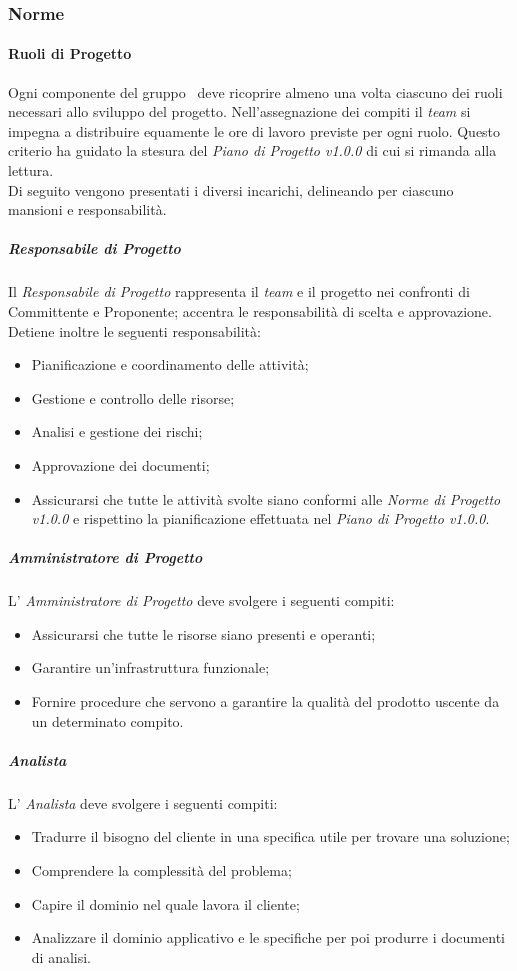 \subsubsection{Norme}
\paragraph{Ruoli di Progetto}
Ogni componente del gruppo \GRUPPO\ deve ricoprire almeno una volta ciascuno dei ruoli necessari allo sviluppo del progetto. Nell'assegnazione dei compiti il \textit{team} si impegna a distribuire equamente le ore di lavoro previste per ogni ruolo. Questo criterio ha guidato la stesura del \textit{Piano di Progetto v1.0.0} di cui si rimanda alla lettura.\\
Di seguito vengono presentati i diversi incarichi, delineando per ciascuno mansioni e responsabilità.

\subparagraph{Responsabile di Progetto} Il \textit{Responsabile di Progetto} rappresenta il \textit{team} e il progetto nei confronti di Committente e Proponente; accentra le responsabilità di scelta e approvazione. Detiene inoltre le seguenti responsabilità:
\begin{itemize}
\item Pianificazione e coordinamento delle attività;
\item Gestione e controllo delle risorse;
\item Analisi e gestione dei rischi;
\item Approvazione dei documenti;
\item Assicurarsi che tutte le attività svolte siano conformi alle \textit{Norme di Progetto
v1.0.0} e rispettino la pianificazione effettuata nel \textit{Piano di Progetto v1.0.0}.
\end{itemize}  

\subparagraph{Amministratore di Progetto} L' \textit{Amministratore di Progetto} deve svolgere i seguenti compiti:
\begin{itemize}
\item Assicurarsi che tutte le risorse siano presenti e operanti; 
\item Garantire un'infrastruttura funzionale;
\item Fornire procedure che servono a garantire la qualità del prodotto uscente da un
determinato compito.
\end{itemize}

\subparagraph{Analista} L' \textit{Analista} deve svolgere i seguenti compiti:
\begin{itemize}
\item Tradurre il bisogno del cliente in una specifica utile per trovare una soluzione;
\item Comprendere la complessità del problema;
\item Capire il dominio nel quale lavora il cliente;
\item Analizzare il dominio applicativo e le specifiche per poi produrre i documenti di analisi.
\end{itemize}

